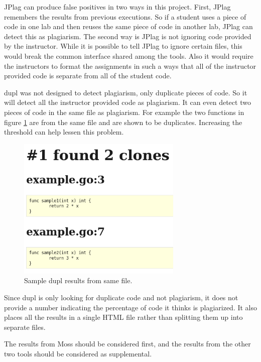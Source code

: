 \documentclass[10pt,journal,compsoc]{IEEEtran}
\begin{document}
	JPlag can produce false positives in two ways in this project. First, JPlag remembers the results from previous executions. So if a student uses a piece of code in one lab and then reuses the same piece of code in another lab, JPlag can detect this as plagiarism. The second way is JPlag is not ignoring code provided by the instructor. While it is possible to tell JPlag to ignore certain files, this would break the common interface shared among the tools. Also it would require the instructors to format the assignments in such a ways that all of the instructor provided code is separate from all of the student code.
	
	dupl was not designed to detect plagiarism, only duplicate pieces of code. So it will detect all the instructor provided code as plagiarism. It can even detect two pieces of code in the same file as plagiarism. For example the two functions in figure \ref{fig:duplSameFile} are from the same file and are shown to be duplicates. Increasing the threshold can help lessen this problem.
	
	\begin{figure}[h!]
		\includegraphics[width=0.7\textwidth]{duplSameFile2.png}
		\caption{Sample dupl results from same file.}
		\label{fig:duplSameFile}
	\end{figure}
	
	Since dupl is only looking for duplicate code and not plagiarism, it does not provide a number indicating the percentage of code it thinks is plagiarized. It also places all the results in a single HTML file rather than splitting them up into separate files.
	
	The results from Moss should be considered first, and the results from the other two tools should be considered as supplemental.
	
\end{document}
